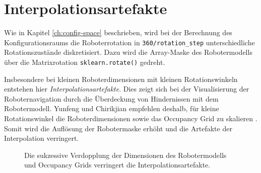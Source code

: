 \vspace*{0.1cm}
\section{Interpolationsartefakte}

Wie in Kapitel \ref{ch:config-space} beschrieben, wird bei der Berechnung des Konfigurationsraums die Roboterrotation in \texttt{360/\texttt{rotation\_step}} unterschiedliche Rotationszustände diskretisiert. Dazu wird die Array-Maske des Robotermodells über die Matrixrotation \texttt{sklearn.rotate()} gedreht. 

Insbesondere bei kleinen Roboterdimensionen mit kleinen Rotationswinkeln entstehen hier \textit{Interpolationsartefakte}.
Dies zeigt sich bei der Visualisierung der Roboternavigation durch die Überdeckung von Hindernissen mit dem Robotermodell. Yunfeng und Chirikjian empfehlen deshalb, für kleine Rotationswinkel die Roboterdimensionen sowie das Occupancy Grid zu skalieren \cite{yujiang.2017}.
Somit wird die Auflösung der Robotermaske erhöht und die Artefakte der Interpolation verringert.
\vspace*{0.5cm}
\begin{figure}[h!]
	\footnotesize
	\centering
	\hspace*{-0.1\linewidth}
	\centerline{}
	\hspace*{-0.1\linewidth}
	\vspace*{0.3cm}
	\caption{Die sukzessive Verdopplung der Dimensionen des Robotermodells und Occupancy Grids verringert die Interpolationsartefakte.}
\end{figure}







